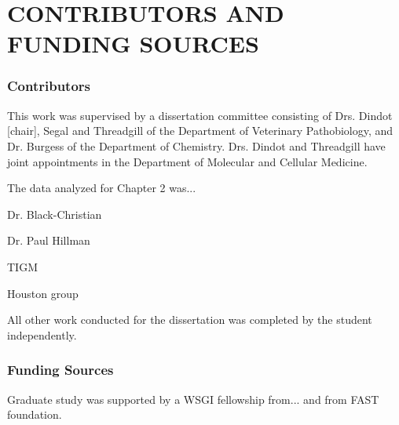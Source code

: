 \chapter*{CONTRIBUTORS AND FUNDING SOURCES}

\subsection*{Contributors}
This work was supervised by a dissertation committee consisting of Drs. Dindot [chair], Segal and Threadgill of the Department of Veterinary Pathobiology, and Dr. Burgess of the Department of Chemistry. Drs. Dindot and Threadgill have joint appointments in the Department of Molecular and Cellular Medicine.

The data analyzed for Chapter 2 was...

Dr. Black-Christian

Dr. Paul Hillman

TIGM

Houston group

All other work conducted for the dissertation was completed by the student independently.
\subsection*{Funding Sources}
Graduate study was supported by a WSGI fellowship from... and from FAST foundation.
\pagebreak{}

